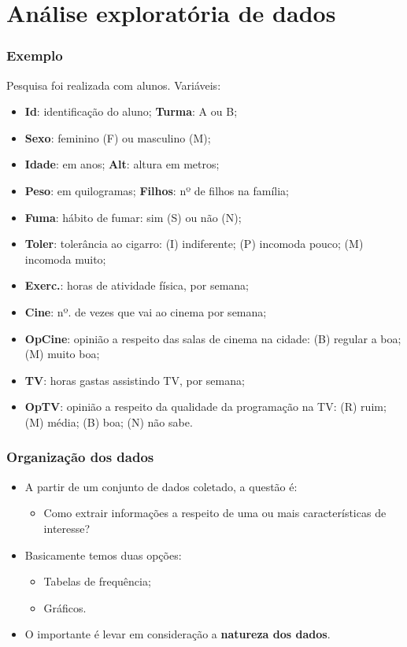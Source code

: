 \documentclass[11pt]{beamer}
\begin{document}
\section{Análise exploratória de dados}
\begin{frame}
\frametitle{Exemplo}

Pesquisa foi realizada com alunos. Variáveis:

\begin{itemize}
\item
  \textbf{Id}: identificação do aluno; \textbf{Turma}: A ou B;
\item
  \textbf{Sexo}: feminino (F) ou masculino (M);
\item
  \textbf{Idade}: em anos; \textbf{Alt}: altura em metros;
\item
  \textbf{Peso}: em quilogramas; \textbf{Filhos}: nº de filhos na
  família;
\item
  \textbf{Fuma}: hábito de fumar: sim (S) ou não (N);
\item
  \textbf{Toler}: tolerância ao cigarro: (I) indiferente; (P) incomoda
  pouco; (M) incomoda muito;
\item
  \textbf{Exerc.}: horas de atividade física, por semana;
\item
  \textbf{Cine}: nº. de vezes que vai ao cinema por semana;
\item
  \textbf{OpCine}: opinião a respeito das salas de cinema na cidade: (B)
  regular a boa; (M) muito boa;
\item
  \textbf{TV}: horas gastas assistindo TV, por semana;
\item
  \textbf{OpTV}: opinião a respeito da qualidade da programação na TV:
  (R) ruim; (M) média; (B) boa; (N) não sabe.
\end{itemize}
\end{frame}

\begin{frame}
\frametitle{Organização dos dados}

\begin{itemize}
\item
  A partir de um conjunto de dados coletado, a questão é:

  \begin{itemize}
  \item
    Como extrair informações a respeito de uma ou mais características
    de interesse?
  \end{itemize}
\item
  Basicamente temos duas opções:

  \begin{itemize}
  \item
    Tabelas de frequência;
  \item
    Gráficos.
  \end{itemize}
\item
  O importante é levar em consideração a \textbf{natureza dos dados}.
\end{itemize}
\end{frame}
\end{document}
